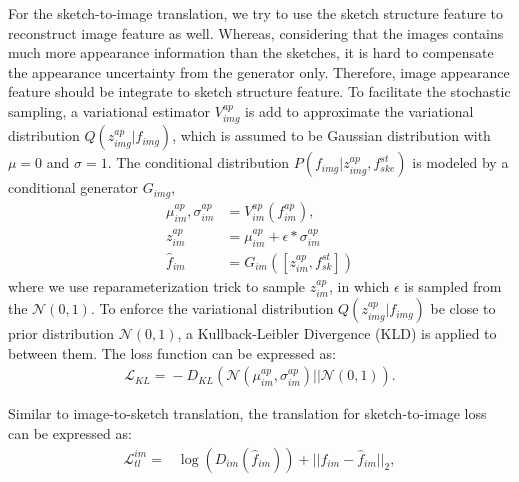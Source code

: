 \documentclass[10pt,twocolumn,letterpaper]{article}
\begin{document}
For the sketch-to-image translation, we try to use the sketch structure feature to reconstruct image feature as well. 
Whereas, considering that the images contains much more appearance information than the sketches, it is hard to compensate the appearance uncertainty from the generator only. 
Therefore, image appearance feature should be integrate to sketch structure feature. 
To facilitate the stochastic sampling, a variational estimator $V_{img}^{ap}$ is add to approximate the variational distribution $Q(z_{img}^{ap}|f_{img})$, which is assumed to be Gaussian distribution with $\mu=0$ and $\sigma=1$. The conditional distribution $P(f_{img}|z_{img}^{ap}, f_{ske}^{st})$ is modeled by a conditional generator $G_{img}$,
\begin{align}
    \mu_{im}^{ap}, \sigma_{im}^{ap} &= V_{im}^{ap}(f_{im}^{ap}), \label{eq:8} \\
    z_{im}^{ap} &= \mu_{im}^{ap} + \epsilon * \sigma_{im}^{ap} \label{eq:9} \\
    \hat{f}_{im} &= G_{im}([z_{im}^{ap}, f_{sk}^{st}])
\end{align}
where we use reparameterization trick \cite{kingma2013auto} to sample $z_{im}^{ap}$, in which $\epsilon$ is sampled from the $\mathcal{N}(0,1)$.
To enforce the variational distribution $Q(z_{img}^{ap}|f_{img})$ be close to prior distribution $\mathcal{N}(0, 1)$, a Kullback-Leibler Divergence (KLD) is applied to between them. The loss function can be expressed as:
\begin{align}
    \mathcal{L}_{KL} = \!-\!D_{KL}(\mathcal{N}(\mu_{im}^{ap}, \sigma_{im}^{ap}) || \mathcal{N}(0, 1)).
\end{align}

Similar to image-to-sketch translation, the translation for sketch-to-image loss can be expressed as: 
\begin{align}
    \mathcal{L}_{tl}^{im} =& \log(D_{im}(\hat{f}_{im})) \!+\! ||f_{im}\!-\!\hat{f}_{im}||_2,
\end{align}
\end{document}
